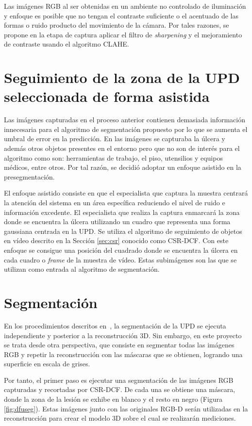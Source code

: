 {Las imágenes RGB al ser obtenidas en un ambiente no controlado de iluminación y enfoque es posible que no tengan el contraste suficiente o el acentuado de las formas o ruido producto del movimiento de la cámara. Por tales razones, se propone en la etapa de captura aplicar el filtro de \textit{sharpening} y el mejoramiento de contraste usando el algoritmo CLAHE.

\section{Seguimiento de la zona de la UPD seleccionada de forma asistida}

Las imágenes capturadas en el proceso anterior contienen demasiada información innecesaria para el algoritmo de segmentación propuesto por lo que se aumenta el umbral de error en la predicción. En las imágenes se capturaba la úlcera y además otros objetos presentes en el entorno pero que no son de interés para el algoritmo como son: herramientas de trabajo, el piso, utensilios y equipos médicos, entre otros. Por tal razón, se decidió adoptar un enfoque asistido en la presegmentación. 

El enfoque asistido consiste en que el especialista que captura la muestra centrará la atención del sistema en un área específica reduciendo el nivel de ruido e información excedente. El especialista que realiza la captura enmarcará la zona donde se encuentra la úlcera utilizando un cuadro que representa una forma gaussiana centrada en la UPD. Se utiliza el algoritmo de seguimiento de objetos en vídeo descrito en la Sección \ref{sec:csr} conocido como CSR-DCF. Con este enfoque se consigue una posición del cuadrado donde se encuentra la úlcera en cada cuadro o \textit{frame} de la muestra de vídeo. Estas subimágenes son las que se utilizan como entrada al algoritmo de segmentación.

\section{Segmentación}

En los procedimientos descritos en~\cite{wang2014smartphone, filko2018wound}, la segmentación de la UPD se ejecuta independiente y posterior a la reconstrucción 3D. Sin embargo, en este proyecto se trata desde otra perspectiva, que consiste  en segmentar todas las imágenes RGB y repetir la reconstrucción con las máscaras que se obtienen, logrando una superficie en escala de grises.

Por tanto, el primer paso es ejecutar una segmentación de las imágenes RGB capturadas y recortadas por CSR-DCF. De cada una se obtiene una máscara, donde la zona de la lesión se exhibe en blanco y el resto en negro (Figura \ref{fig:dfuseg}). Estas imágenes junto con las originales RGB-D serán utilizadas en la reconstrucción para crear el modelo 3D sobre el cual se realizarán mediciones.

}
